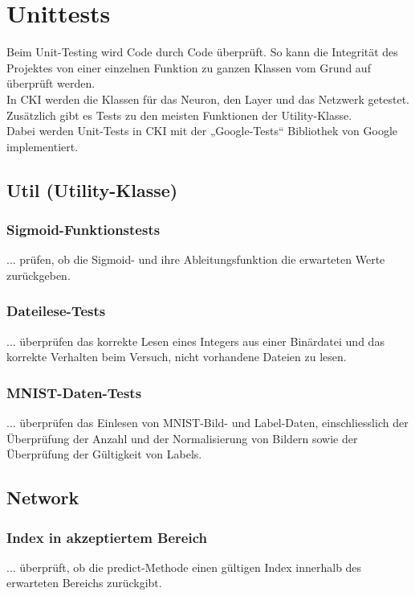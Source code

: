 \section{Unittests}
\label{sec:DesignUnitTesting}
Beim Unit-Testing wird Code durch Code überprüft. So kann die Integrität des Projektes von einer einzelnen Funktion zu ganzen Klassen vom Grund auf überprüft werden.
\\
In CKI werden die Klassen für das Neuron, den Layer und das Netzwerk getestet. Zusätzlich gibt es Tests zu den meisten Funktionen der Utility-Klasse.
\\
Dabei werden Unit-Tests in CKI mit der „Google-Tests“ Bibliothek von Google implementiert.

\subsection{Util (Utility-Klasse)}
\label{sec:DesignUtilUtilityKlasse}
\subsubsection{Sigmoid-Funktionstests}
\label{sec:DesignSigmoidFunktionstests}
... prüfen, ob die Sigmoid- und ihre Ableitungsfunktion die erwarteten Werte zurückgeben.
\subsubsection{Dateilese-Tests}
\label{sec:DesignDateileseTests}
... überprüfen das korrekte Lesen eines Integers aus einer Binärdatei und das korrekte Verhalten beim Versuch, nicht vorhandene Dateien zu lesen.
\subsubsection{MNIST-Daten-Tests}
\label{sec:DesignMNISTDatenTests}
... überprüfen das Einlesen von MNIST-Bild- und Label-Daten, einschliesslich der Überprüfung der Anzahl und der Normalisierung von Bildern sowie der Überprüfung der Gültigkeit von Labels.

\subsection{Network}
\label{sec:DesignNetwork}
\subsubsection{Index in akzeptiertem Bereich}
\label{sec:DesignIndexInAkzeptiertemBereich}
... überprüft, ob die predict-Methode einen gültigen Index innerhalb des erwarteten Bereichs zurückgibt.
